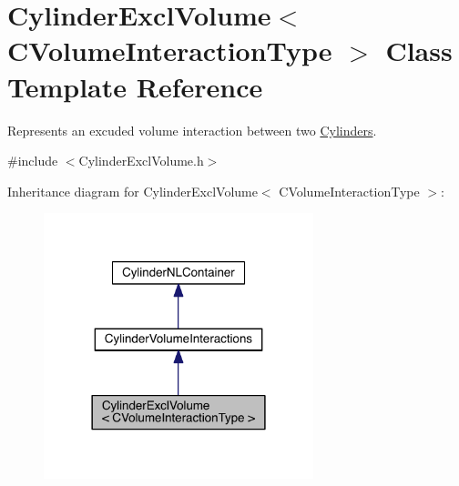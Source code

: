 \hypertarget{classCylinderExclVolume}{\section{Cylinder\+Excl\+Volume$<$ C\+Volume\+Interaction\+Type $>$ Class Template Reference}
\label{classCylinderExclVolume}
}


Represents an excuded volume interaction between two \hyperlink{classCylinder}{Cylinders}.  




{\ttfamily \#include $<$Cylinder\+Excl\+Volume.\+h$>$}



Inheritance diagram for Cylinder\+Excl\+Volume$<$ C\+Volume\+Interaction\+Type $>$\+:\nopagebreak
\begin{figure}[H]
\begin{center}
\leavevmode
\includegraphics[width=222pt]{classCylinderExclVolume__inherit__graph}
\end{center}
\end{figure}


